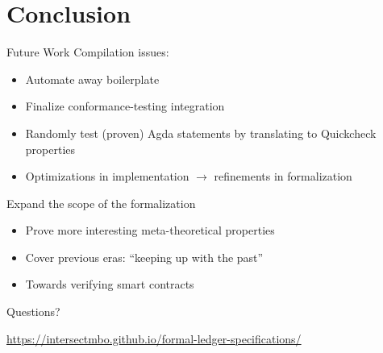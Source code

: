 \documentclass[aspectratio=169]{beamer}
\renewcommand\alert[1]{\textcolor{mLightBrown}{#1}}
\begin{document}
\section{Conclusion}
\begin{frame}{Future Work}
Compilation issues:
  \begin{itemize}
  \item Automate away \alert{boilerplate}
  \item Finalize \alert{conformance-testing} integration
  \item Randomly test (proven) Agda statements by translating
    to \alert{Quickcheck} properties
  \item Optimizations in implementation $\to$ \alert{refinements} in formalization
  \end{itemize}

\pause
Expand the scope of the formalization
  \begin{itemize}
  \item Prove more interesting meta-theoretical \alert{properties}
  \item Cover previous \alert{eras}: ``keeping up with the past''
  \item Towards verifying \alert{smart contracts}
  \end{itemize}
\end{frame}
\begin{frame}[standout]

{\Huge Questions?}

\vfill
\begin{center}
\alert{\url{https://intersectmbo.github.io/formal-ledger-specifications/}}

\end{center}
\end{frame}
\end{document}
